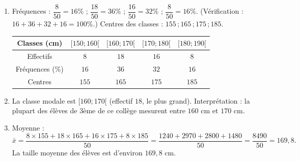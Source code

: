 \documentclass[11pt]{article}
\begin{document}
\begin{corrige}
\begin{enumerate}
    \item Fréquences : $\dfrac{8}{50} = 16\%$ ; $\dfrac{18}{50} = 36\%$ ; $\dfrac{16}{50} = 32\%$ ; $\dfrac{8}{50} = 16\%$. (Vérification : $16 + 36 + 32 + 16 = 100\%$.)
    Centres des classes : $155\,; 165\,; 175\,; 185$.
    \begin{center}
    \begin{tabular}{|c|c|c|c|c|}\hline
    Classes (cm) & $[150 ; 160[$ & $[160 ; 170[$ & $[170 ; 180[$ & $[180 ; 190[$ \\ \hline
    Effectifs & $8$ & $18$ & $16$ & $8$ \\ \hline
    Fréquences (\%) & $16$ & $36$ & $32$ & $16$ \\ \hline
    Centres & $155$ & $165$ & $175$ & $185$ \\ \hline
    \end{tabular}
    \end{center}
    \item La classe modale est $[160 ; 170[$ (effectif $18$, le plus grand). Interprétation : la plupart des élèves de 3ème de ce collège mesurent entre $160$ cm et $170$ cm.
    \item Moyenne :
    \[ \bar{x} = \dfrac{8 \times 155 + 18 \times 165 + 16 \times 175 + 8 \times 185}{50} = \dfrac{1240 + 2970 + 2800 + 1480}{50} = \dfrac{8490}{50} = 169,8. \]
    La taille moyenne des élèves est d'environ $169,8$ cm.
\end{enumerate}
\end{corrige}
\end{document}
